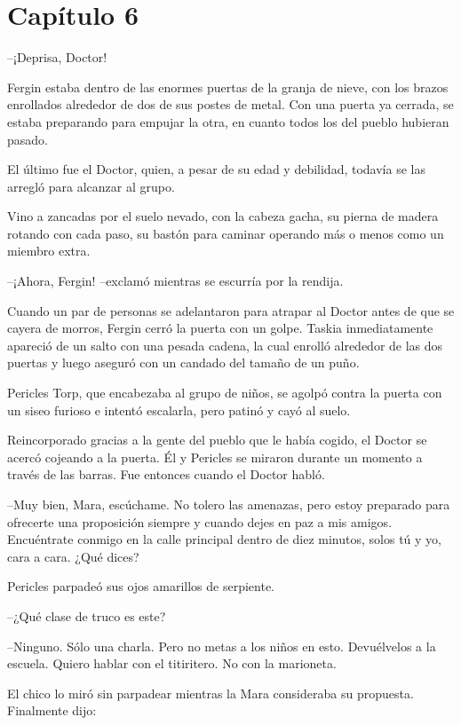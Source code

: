 \chapter*{Capítulo 6}

--¡Deprisa, Doctor!

Fergin estaba dentro de las enormes puertas de la granja de nieve, con los brazos enrollados alrededor de dos de sus postes de metal. Con una puerta ya cerrada, se estaba preparando para empujar la otra, en cuanto todos los del pueblo hubieran pasado.

El último fue el Doctor, quien, a pesar de su edad y debilidad, todavía se las arregló para alcanzar al grupo.

Vino a zancadas por el suelo nevado, con la cabeza gacha, su pierna de madera rotando con cada paso, su bastón para caminar operando más o menos como un miembro extra.

--¡Ahora, Fergin! --exclamó mientras se escurría por la rendija.

Cuando un par de personas se adelantaron para atrapar al Doctor antes de que se cayera de morros, Fergin cerró la puerta con un golpe. Taskia inmediatamente apareció de un salto con una pesada cadena, la cual enrolló alrededor de las dos puertas y luego aseguró con un candado del tamaño de un puño.

Pericles Torp, que encabezaba al grupo de niños, se agolpó contra la puerta con un siseo furioso e intentó escalarla, pero patinó y cayó al suelo.

Reincorporado gracias a la gente del pueblo que le había cogido, el Doctor se acercó cojeando a la puerta. Él y Pericles se miraron durante un momento a través de las barras. Fue entonces cuando el Doctor habló.

--Muy bien, Mara, escúchame. No tolero las amenazas, pero estoy preparado para ofrecerte una proposición siempre y cuando dejes en paz a mis amigos. Encuéntrate conmigo en la calle principal dentro de diez minutos, solos tú y yo, cara a cara. ¿Qué dices?

Pericles parpadeó sus ojos amarillos de serpiente.

--¿Qué clase de truco es este?

--Ninguno. Sólo una charla. Pero no metas a los niños en esto. Devuélvelos a la escuela. Quiero hablar con el titiritero. No con la marioneta.

El chico lo miró sin parpadear mientras la Mara consideraba su propuesta. Finalmente dijo:

